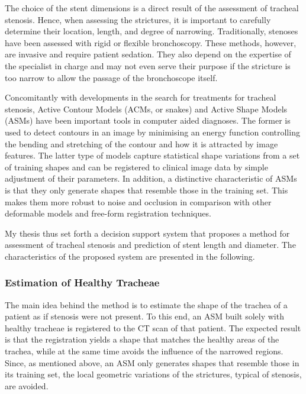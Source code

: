 \documentclass[a4paper]{article}
\begin{document}
The choice of the stent dimensions is a direct result of the assessment of tracheal stenosis. Hence, when assessing the strictures, it is important to carefully determine their location, length, and degree of narrowing. Traditionally, stenoses have been assessed with rigid or flexible bronchoscopy. These methods, however, are invasive and require patient sedation. They also depend on the expertise of the specialist in charge and may not even serve their purpose if the stricture is too narrow to allow the passage of the bronchoscope itself. 

Concomitantly with developments in the search for treatments for tracheal stenosis, Active Contour Models (ACMs, or snakes) and Active Shape Models (ASMs) have been important tools in computer aided diagnoses. The former is used to detect contours in an image by minimising an energy function controlling the bending and stretching of the contour and how it is attracted by image features. The latter type of models capture statistical shape variations from a set of training shapes and can be registered to clinical image data by simple adjustment of their parameters. In addition, a distinctive characteristic of ASMs is that they only generate shapes that resemble those in the training set. This makes them more robust to noise and occlusion in comparison with other deformable models and free-form registration techniques.

My thesis thus set forth a decision support system that proposes a method for assessment of tracheal stenosis and prediction of stent length and diameter. The characteristics of the proposed system are presented in the following.

\subsubsection{Estimation of Healthy Tracheae}

The main idea behind the method is to estimate the shape of the trachea of a patient as if stenosis were not present. To this end, an ASM built solely with healthy tracheae is registered to the CT scan of that patient. The expected result is that the registration yields a shape that matches the healthy areas of the trachea, while at the same time avoids the influence of the narrowed regions. Since, as mentioned above, an ASM only generates shapes that resemble those in its training set, the local geometric variations of the strictures, typical of stenosis, are avoided. 
\end{document}
